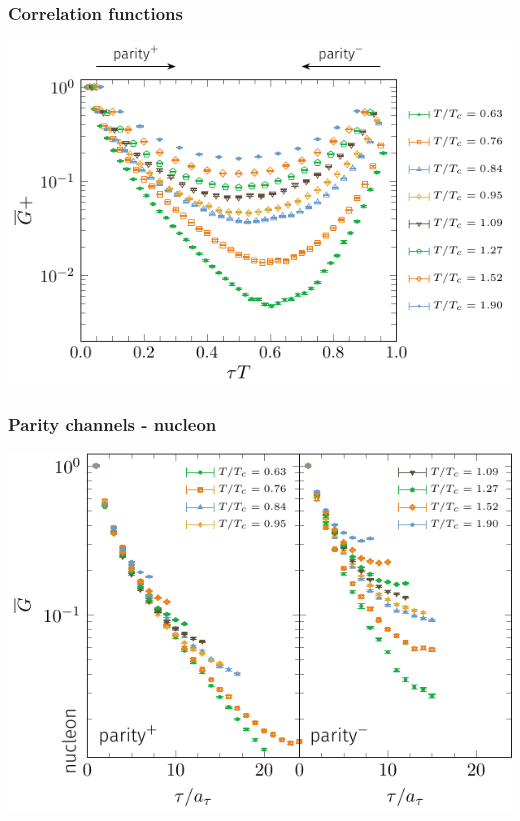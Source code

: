 \documentclass[11pt]{beamer}
\begin{document}
\begin{frame}
  \frametitle{Correlation functions}

  \vspace*{-8mm}
  \begin{center}
    \hspace*{-8mm}
    \includegraphics[width=1.1\textwidth]{plots/correlator_symmetry.pdf}
  \end{center}

\end{frame}

\begin{frame}
  \frametitle{Parity channels - nucleon}

  \begin{center}
    \hspace*{-10mm}
    \includegraphics[width=\textwidth]{plots/correlator_nucleon.pdf}
  \end{center}

\end{frame}
\end{document}
